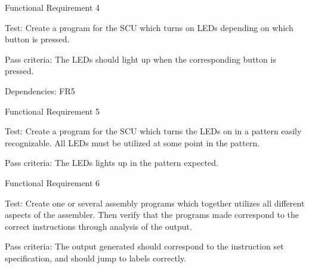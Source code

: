 {\sc Functional Requirement 4}
\begin{Test}
  {\em \FRIV}
  
  {\sc Test:} Create a program for the \ac{SCU} which turns on \acp{LED}
  depending on which button is pressed.

  {\sc Pass criteria:} The \acp{LED} should light up when the corresponding
  button is pressed.

  {\sc Dependencies:} FR5
\end{Test}

{\sc Functional Requirement 5}
\begin{Test}
  {\em \FRV}
  
  {\sc Test:} Create a program for the \ac{SCU} which turns the \acp{LED} on in
  a pattern easily recognizable. All \acp{LED} must be utilized at some point
  in the pattern.

  {\sc Pass criteria:} The LEDs lights up in the pattern expected.
\end{Test}

\newpage %
{\sc Functional Requirement 6}
\begin{Test}
  {\em \FRVI}
  
  {\sc Test:} Create one or several assembly programs which together utilizes
  all different aspects of the assembler. Then verify that the programs made
  correspond to the correct instructions through analysis of the output.

  {\sc Pass criteria:} The output generated should correspond to the instruction
  set specification, and should jump to labels correctly.
\end{Test}


